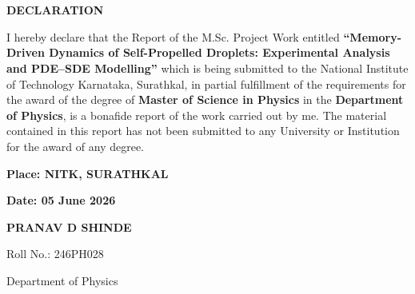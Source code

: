\chapter*{}

\begin{center}
{\Huge\bfseries DECLARATION}
\end{center}

\vspace{1cm}

I hereby declare that the Report of the M.Sc. Project Work entitled
\textbf{``Memory-Driven Dynamics of Self-Propelled Droplets: Experimental Analysis and PDE--SDE Modelling''}
which is being submitted to the National Institute of Technology
Karnataka, Surathkal, in partial fulfillment of the requirements
for the award of the degree of \textbf{Master of Science in Physics}
in the \textbf{Department of Physics}, is a bonafide report of the
work carried out by me. The material contained in this report has
not been submitted to any University or Institution for the award
of any degree.

\vspace{4cm}

\noindent
\begin{minipage}[t]{0.45\textwidth}
\textbf{Place: NITK, SURATHKAL}

\vspace{0.5cm}

\textbf{Date: 05 June 2026}
\end{minipage}
\hfill
\begin{minipage}[t]{0.45\textwidth}
\raggedleft
\textbf{PRANAV D SHINDE}

\vspace{0.5cm}

Roll No.: 246PH028

Department of Physics
\end{minipage}
